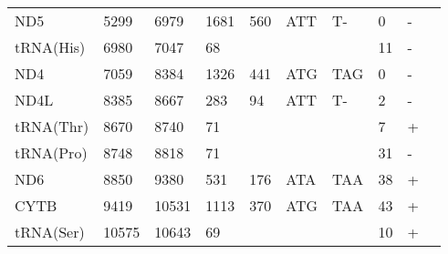 \documentclass[../DISSERTACAO_MAIN.tex]{subfiles}
\begin{document}
\begin{longtable}{llllllllllllllllllllll}
			ND5          & 5299           & \multicolumn{2}{l}{6979}  & \multicolumn{2}{l}{1681}       & \multicolumn{2}{l}{560}       & \multicolumn{3}{l}{ATT}                 & \multicolumn{3}{l}{T-}    & \multicolumn{3}{l}{0}          & \multicolumn{3}{l}{-}      & \multicolumn{2}{l}{} \\
			tRNA(His)    & 6980           & \multicolumn{2}{l}{7047}  & \multicolumn{2}{l}{68}         & \multicolumn{2}{l}{}          & \multicolumn{3}{l}{}                    & \multicolumn{3}{l}{}      & \multicolumn{3}{l}{11}         & \multicolumn{3}{l}{-}      & \multicolumn{2}{l}{} \\
			ND4          & 7059           & \multicolumn{2}{l}{8384}  & \multicolumn{2}{l}{1326}       & \multicolumn{2}{l}{441}       & \multicolumn{3}{l}{ATG}                 & \multicolumn{3}{l}{TAG}   & \multicolumn{3}{l}{0}          & \multicolumn{3}{l}{-}      & \multicolumn{2}{l}{} \\
			ND4L         & 8385           & \multicolumn{2}{l}{8667}  & \multicolumn{2}{l}{283}        & \multicolumn{2}{l}{94}        & \multicolumn{3}{l}{ATT}                 & \multicolumn{3}{l}{T-}    & \multicolumn{3}{l}{2}          & \multicolumn{3}{l}{-}      & \multicolumn{2}{l}{} \\
			tRNA(Thr)    & 8670           & \multicolumn{2}{l}{8740}  & \multicolumn{2}{l}{71}         & \multicolumn{2}{l}{}          & \multicolumn{3}{l}{}                    & \multicolumn{3}{l}{}      & \multicolumn{3}{l}{7}          & \multicolumn{3}{l}{+}      & \multicolumn{2}{l}{} \\
			tRNA(Pro)    & 8748           & \multicolumn{2}{l}{8818}  & \multicolumn{2}{l}{71}         & \multicolumn{2}{l}{}          & \multicolumn{3}{l}{}                    & \multicolumn{3}{l}{}      & \multicolumn{3}{l}{31}         & \multicolumn{3}{l}{-}      & \multicolumn{2}{l}{} \\
			ND6          & 8850           & \multicolumn{2}{l}{9380}  & \multicolumn{2}{l}{531}        & \multicolumn{2}{l}{176}       & \multicolumn{3}{l}{ATA}                 & \multicolumn{3}{l}{TAA}   & \multicolumn{3}{l}{38}         & \multicolumn{3}{l}{+}      & \multicolumn{2}{l}{} \\
			CYTB         & 9419           & \multicolumn{2}{l}{10531} & \multicolumn{2}{l}{1113}       & \multicolumn{2}{l}{370}       & \multicolumn{3}{l}{ATG}                 & \multicolumn{3}{l}{TAA}   & \multicolumn{3}{l}{43}         & \multicolumn{3}{l}{+}      & \multicolumn{2}{l}{} \\
			tRNA(Ser)    & 10575          & \multicolumn{2}{l}{10643} & \multicolumn{2}{l}{69}         & \multicolumn{2}{l}{}          & \multicolumn{3}{l}{}                    & \multicolumn{3}{l}{}      & \multicolumn{3}{l}{10}         & \multicolumn{3}{l}{+}      & \multicolumn{2}{l}{} \\

\end{longtable}
\end{document}

